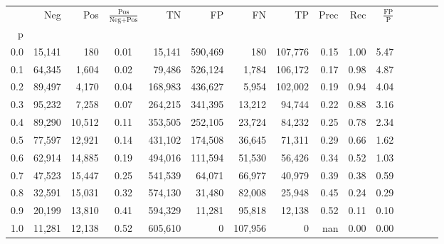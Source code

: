 \begin{tabular}{rrrcrrrrrrrrrrr}
\toprule
{} &     Neg &     Pos & $\frac{\text{Pos}}{\text{Neg}+\text{Pos}}$ &       TN &       FP &       FN &       TP &  Prec &   Rec & $\frac{\text{FP}}{\text{P}}$ \\
p   &         &         &                                            &          &          &          &          &       &       &                              \\
\midrule
0.0 &  15,141 &     180 &                                       0.01 &   15,141 &  590,469 &      180 &  107,776 &  0.15 &  1.00 &                         5.47 \\
0.1 &  64,345 &   1,604 &                                       0.02 &   79,486 &  526,124 &    1,784 &  106,172 &  0.17 &  0.98 &                         4.87 \\
0.2 &  89,497 &   4,170 &                                       0.04 &  168,983 &  436,627 &    5,954 &  102,002 &  0.19 &  0.94 &                         4.04 \\
0.3 &  95,232 &   7,258 &                                       0.07 &  264,215 &  341,395 &   13,212 &   94,744 &  0.22 &  0.88 &                         3.16 \\
0.4 &  89,290 &  10,512 &                                       0.11 &  353,505 &  252,105 &   23,724 &   84,232 &  0.25 &  0.78 &                         2.34 \\
0.5 &  77,597 &  12,921 &                                       0.14 &  431,102 &  174,508 &   36,645 &   71,311 &  0.29 &  0.66 &                         1.62 \\
0.6 &  62,914 &  14,885 &                                       0.19 &  494,016 &  111,594 &   51,530 &   56,426 &  0.34 &  0.52 &                         1.03 \\
0.7 &  47,523 &  15,447 &                                       0.25 &  541,539 &   64,071 &   66,977 &   40,979 &  0.39 &  0.38 &                         0.59 \\
0.8 &  32,591 &  15,031 &                                       0.32 &  574,130 &   31,480 &   82,008 &   25,948 &  0.45 &  0.24 &                         0.29 \\
0.9 &  20,199 &  13,810 &                                       0.41 &  594,329 &   11,281 &   95,818 &   12,138 &  0.52 &  0.11 &                         0.10 \\
1.0 &  11,281 &  12,138 &                                       0.52 &  605,610 &        0 &  107,956 &        0 &   nan &  0.00 &                         0.00 \\
\bottomrule
\end{tabular}
